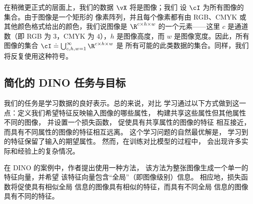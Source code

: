 \documentclass[../../book-main_zh.tex]{subfiles}
\begin{document}
在稍微更正式的层面上，我们的数据 \(\vX\) 将是图像；我们
设 \(\cI\) 为所有图像的集合。由于图像是一个矩形的
像素阵列，并且每个像素都有由 RGB、CMYK 或
其他颜色格式给出的颜色，我们说图像是 \(\R^{c
\times h \times w}\) 的一个元素——这里 \(c\) 是通道数（即
RGB 为 \(3\)，CMYK 为 \(4\)），\(h\) 是图像高度，而
\(w\) 是图像宽度。因此，所有图像的集合 \(\cI
\doteq \bigcup_{c, h, w = 1}^{\infty}\R^{c \times h \times w}\) 是
所有可能的此类数据的集合。同样，我们将反复使用这种符号。

\subsection{简化的 DINO 任务与目标}
\label{sub:contrastive_learning_objective}

我们的任务是学习数据的良好表示。总的来说，对比
学习通过以下方式做到这一点：定义我们希望特征反映输入图像的哪些属性，
构建共享这些属性但其他属性不同的图像，
并设置一个损失函数，
促使具有共享属性的图像的特征
相互接近，而具有不同属性的图像的特征相互远离。
这个学习问题的自然最优解是，
学习到的特征保留了输入的期望属性。
然而，在训练对比模型的过程中，
会出现许多实际和经验上的复杂情况。

在 DINO 的案例中，作者提出使用一种方法，
该方法为整张图像生成一个单一的特征向量，并希望
该特征向量包含“全局”（即图像级别）信息。
相应地，损失函数将促使具有相似全局
信息的图像具有相似的特征，而具有不同全局
信息的图像具有不同的特征。
\end{document}
